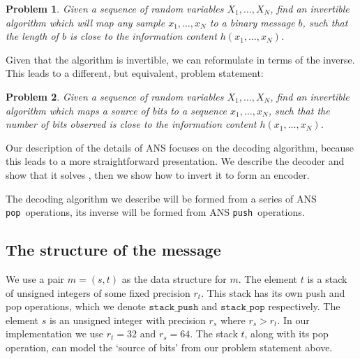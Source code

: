 \documentclass{article}
\newtheorem{problem}{Problem}
\newcommand{\push}{\texttt{push}}
\newcommand{\pop}{\texttt{pop}}
\begin{document}
\begin{problem}\label{prob:default}
  Given a sequence of random variables $X_1, \ldots, X_N$, find an invertible
  algorithm which will map any sample $x_1, \ldots, x_N$ to a binary message
  $b$, such that the length of $b$ is close to the information content $h(x_1,
  \ldots, x_N)$.
\end{problem}

Given that the algorithm is invertible, we can reformulate 
in terms of the inverse. This leads to a different, but equivalent, problem
statement:

\begin{problem}\label{prob:alt}
  Given a sequence of random variables $X_1, \ldots, X_N$, find an invertible
  algorithm which maps a source of bits to a sequence $x_1, \ldots, x_N$, such
  that the number of bits observed is close to the information content $h(x_1,
  \ldots, x_N)$.
\end{problem}

Our description of the details of ANS focuses on the decoding algorithm,
because this leads to a more straightforward presentation. We describe the
decoder and show that it solves , then we show how to invert it
to form an encoder.

The decoding algorithm we describe will be formed from a series of ANS \pop\
operations, its inverse will be formed from ANS \push\ operations.

\subsection*{The structure of the message}
We use a pair $m = (s, t)$ as the data structure for $m$. The element $t$ is a
stack of unsigned integers of some fixed precision $r_t$. This stack has its
own push and pop operations, which we denote $\texttt{stack\_push}$ and
$\texttt{stack\_pop}$ respectively. The element $s$ is an unsigned integer with
precision $r_s$ where $r_s > r_t$. In our implementation we use $r_t = 32$ and
$r_s = 64$. The stack $t$, along with its pop operation, can model the `source
of bits' from our problem statement above.
\end{document}
